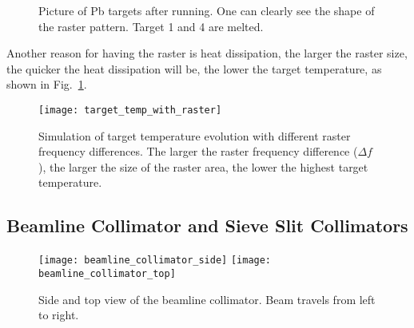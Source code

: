 \begin{figure}
    \caption{Picture of Pb targets after running. One can clearly see the shape
    of the raster pattern. Target 1 and 4 are melted.}
\end{figure}

Another reason for having the raster is heat dissipation, the larger the raster size,
the quicker the heat dissipation will be, the lower the target temperature, as
shown in Fig.~\ref{fig:target_temp_with_raster}.
\begin{figure}
    \centering
    \texttt{[image: target\_temp\_with\_raster]}
    \caption{Simulation of target temperature evolution with different raster frequency
    differences. The larger the raster frequency difference ($\Delta f$), the larger
    the size of the raster area, the lower the highest target temperature.}
    \label{fig:target_temp_with_raster}
\end{figure}

\subsection{Beamline Collimator and Sieve Slit Collimators}
\begin{figure}[!h]
    \centering
    \texttt{[image: beamline\_collimator\_side]}
    \hspace{1 cm}
    \texttt{[image: beamline\_collimator\_top]}
    \caption{Side and top view of the beamline collimator. Beam travels from left to right.}
    \label{fig:beamline_collimator}
\end{figure}

